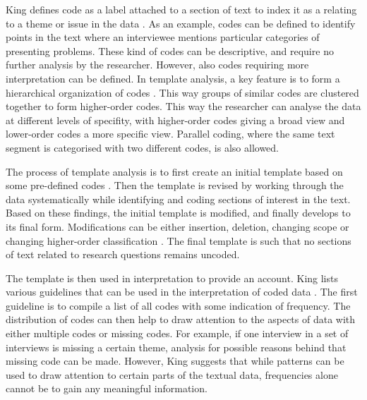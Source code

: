 \documentclass[english]{tktltiki2}
\theoremstyle{definition}
\theoremstyle{remark}
\begin{document}
King defines code as a label attached to a section of text to index it as a relating to a theme or issue in the data \cite{king2004using}. As an example, codes can be defined to identify points in the text where an interviewee mentions particular categories of presenting problems. These kind of codes can be descriptive, and require no further analysis by the researcher. However, also codes requiring more interpretation can be defined. In template analysis, a key feature is to form a hierarchical organization of codes \cite{king2004using}. This way groups of similar codes are clustered together to form higher-order codes. This way the researcher can analyse the data at different levels of specifity, with higher-order codes giving a broad view and lower-order codes a more specific view. Parallel coding, where the same text segment is categorised with two different codes, is also allowed. 

The process of template analysis is to first create an initial template based on some pre-defined codes \cite{king2004using}. Then the template is revised by working through the data systematically while identifying and coding sections of interest in the text. Based on these findings, the initial template is modified, and finally develops to its final form. Modifications can be either insertion, deletion, changing scope or changing higher-order classification \cite{king2004using}. The final template is such that no sections of text related to research questions remains uncoded. 

The template is then used in interpretation to provide an account. King lists various guidelines that can be used in the interpretation of coded data \cite{king2004using}. The first guideline is to compile a list of all codes with some indication of frequency. The distribution of codes can then help to draw attention to the aspects of data with either multiple codes or missing codes. For example, if one interview in a set of interviews is missing a certain theme, analysis for possible reasons behind that missing code can be made. However, King suggests that while patterns can be used to draw attention to certain parts of the textual data, frequencies alone cannot be to gain any meaningful information. 
\end{document}

